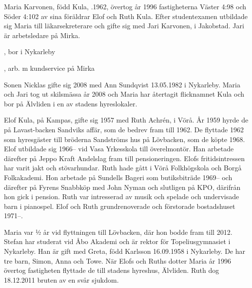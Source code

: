 Maria Karvonen, född Kula, .1962, övertog år 1996 fastigheterna	Väster 4:98 och Söder 4:102 av sina föräldrar Elof och Ruth Kula. Efter studentexamen utbildade sig Maria till läkarsekreterare och gifte sig med Jari Karvonen,  i Jakobstad. Jari är arbetsledare på Mirka.
\begin{jhchildren}
  \item {}, bor i Nykarleby
  \item {}
  \item {}, arb. m kundservice på Mirka
\end{jhchildren}
Sonen Nicklas gifte sig 2008 med Ann Sundqvist 13.05.1982 i Nykarleby. Maria och Jari tog ut skilsmässa år 2008 och Maria har återtagit flicknamnet Kula och bor på Älvliden i en av stadens hyreslokaler.


Elof Kula,  på Kampas, gifte sig 1957 med Ruth Achrén,  i Vörå.  År 1959 hyrde de på Lavast-backen Sandviks affär, som de bedrev fram till 1962. De flyttade 1962 som hyresgäster till bröderna Sandströms hus på Lövbacken, som de köpte 1968. Elof utbildade sig 1966-- vid Vasa Yrkesskola till överelmontör. Han arbetade därefter på Jeppo Kraft Andelslag fram till pensioneringen. Elofs fritidsintressen har varit jakt och stövarhundar. Ruth hade gått i Vörå Folkhögskola och Borgå Folkakademi. Hon arbetade på Sundells Bageri som butiksbiträde 1969-- och därefter på Fyrens Snabbköp med John Nyman och slutligen på KPO, därifrån hon gick i pension. Ruth var intresserad av musik och spelade och undervisade barn i pianospel. Elof och Ruth grundrenoverade och förstorade bostadshuset 1971--.
\begin{jhchildren}
  \item {}
  \item {}
\end{jhchildren}
Maria var ½ år vid flyttningen till Lövbacken, där hon bodde fram till 2012. Stefan har studerat vid Åbo Akademi och är rektor för Topeliusgymnasiet i Nykarleby. Han är gift med Greta, född Karlsson 16.09.1958 i Nykarleby. De har tre barn, Simon, Anna och Towe.	När Elofs och Ruths dotter Maria år 1996 övertog fastigheten flyttade de till stadens hyreshus,  Älvliden.  Ruth dog 18.12.2011 bruten av en svår sjukdom.


